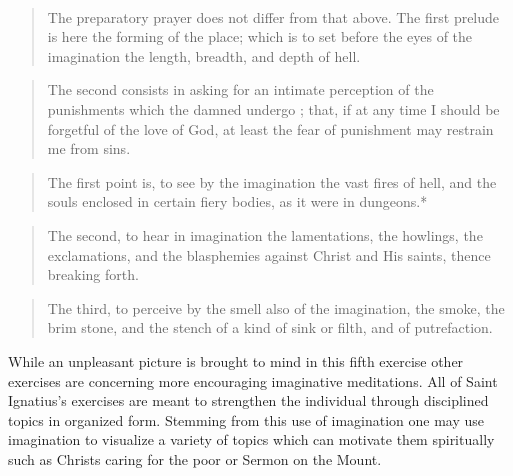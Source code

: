 \documentclass[11pt,a4paper]{scrartcl} %
\begin{document}
\textcolor{Maroon}{}\\
\begin{verse}
The preparatory prayer does not differ from that above. The first prelude is here the forming of the place; which is to set before the eyes of the imagination the length, breadth, and depth of hell.\\
\end{verse}
\begin{verse}
The second consists in asking for an intimate perception of the punishments which the damned undergo ; that, if at any time I should be forgetful of the love of God, at least the fear of punishment may restrain me from sins.
\end{verse}
\begin{verse}
The first point is, to see by the imagination the vast fires of hell, and the souls enclosed in certain fiery bodies, as it were in dungeons.*
\end{verse}
\begin{verse}
The second, to hear in imagination the lamentations, the howlings, the exclamations, and the blasphemies against Christ and His saints, thence breaking forth.
\end{verse}
\begin{verse}
The third, to perceive by the smell also of the imagination, the smoke, the brim stone, and the stench of a kind of sink or filth, and of putrefaction. 
\end{verse}
\begin{doublespace}
While an unpleasant picture is brought to mind in this fifth exercise other exercises are concerning more encouraging imaginative meditations. All of Saint Ignatius's exercises are meant to strengthen the individual through disciplined topics in organized form. Stemming from this use of imagination one may use imagination to visualize a variety of topics which can motivate them spiritually such as Christs caring for the poor or Sermon on the Mount.
\end{doublespace}
\end{document}
